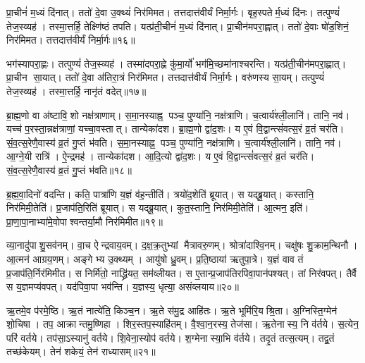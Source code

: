 प्रा॒चीनं॑ म॒ध्यं दि॑नात्।
ततो॑ दे॒वा उ॒क्थ्यं॑ निर॑मिमत।
तत्तदात्त॑वीर्यं निर्मा॒र्गः।
बृह॒स्पतेर्म॒ध्यं दि॑नः।
तत्पुण्यं॑ तेज॒स्व्यह॑।
तस्मा॒त्तर्\mbox{}हि॒ तेक्ष्णि॑ष्ठं तपति।
यत्प्र॑ती॒चीनं॑ म॒ध्यं दि॑नात्।
प्रा॒चीन॑मपरा॒ह्णात्।
ततो॑ दे॒वाः षो॑ड॒शिनं॒ निर॑मिमत।
तत्तदात्त॑वीर्यं निर्मा॒र्गः॥१६॥

भग॑स्यापरा॒ह्णः।
तत्पुण्यं॑ तेज॒स्व्यह॑।
तस्मा॑दपरा॒ह्णे कु॑मा॒र्यो॑ भग॑मि॒च्छमा॑नाश्चरन्ति।
यत्प्र॑ती॒चीन॑मपरा॒ह्णात्।
प्रा॒चीन सा॒यात्।
ततो॑ दे॒वा अ॑तिरा॒त्रं निर॑मिमत।
तत्तदात्त॑वीर्यं निर्मा॒र्गः।
वरु॑णस्य सा॒यम्।
तत्पुण्यं॑ तेज॒स्व्यह॑।
तस्मा॒त्तर्\mbox{}हि॒ नानृ॑तं वदेत्॥१७॥

ब्रा॒ह्म॒णो वा अ॑ष्टावि॒शो नक्ष॑त्राणाम्।
स॒मा॒नस्याह्न॒ पञ्च॒ पुण्या॑नि॒ नक्ष॑त्राणि।
च॒त्वार्य॑श्ली॒लानि॑।
तानि॒ नव॑।
यच्च॑ प॒रस्ता॒न्नक्ष॑त्राणां॒ यच्चा॒वस्तात्।
तान्येका॑दश।
ब्रा॒ह्म॒णो द्वा॑द॒शः।
य ए॒वं वि॒द्वान्त्सं॑वत्स॒रं व्र॒तं चर॑ति।
सं॒व॒त्स॒रेणै॒वास्य॑ व्र॒तं गु॒प्तं भ॑वति।
स॒मा॒नस्याह्न॒ पञ्च॒ पुण्या॑नि॒ नक्ष॑त्राणि।
च॒त्वार्य॑श्ली॒लानि॑।
तानि॒ नव॑।
आ॒ग्ने॒यी रात्रि॑।
ऐ॒न्द्रमह॑।
तान्येका॑दश।
आ॒दि॒त्यो द्वा॑द॒शः।
य ए॒वं वि॒द्वान्त्सं॑वत्स॒रं व्र॒तं चर॑ति।
सं॒व॒त्स॒रेणै॒वास्य॑ व्र॒तं गु॒प्तं भ॑वति॥१८॥\anuvakamend[स॒ङ्ग॒वाथ्षो॑ड॒शिनं॒ निर॑मिमत॒ तत्तदात्त॑वीर्यं निर्मा॒र्गो व॑देद्भवति समा॒नस्याह्न॒ पञ्च॒ पुण्या॑नि॒ नक्ष॑त्राण्य॒ष्टौ च॑]

ब्र॒ह्म॒वा॒दिनो॑ वदन्ति।
कति॒ पात्रा॑णि य॒ज्ञं व॑ह॒न्तीति॑।
त्रयो॑द॒शेति॑ ब्रूयात्।
स यद्ब्रू॒यात्।
कस्तानि॒ निर॑मिमी॒तेति॑।
प्र॒जाप॑ति॒रिति॑ ब्रूयात्।
स यद्ब्रू॒यात्।
कुत॒स्तानि॒ निर॑मिमी॒तेति॑।
आ॒त्मन॒ इति॑।
प्रा॒णा॒पा॒नाभ्या॑मे॒वोपा\-श्वन्तर्या॒मौ निर॑मिमीत॥१९॥

व्या॒नादु॑पाशु॒सव॑नम्।
वा॒च ऐन्द्रवाय॒वम्।
द॒क्ष॒क्र॒तुभ्यां मैत्रावरु॒णम्।
श्रोत्रा॑दाश्वि॒नम्।
चक्षु॑षः शु॒क्राम॒न्थिनौ।
आ॒त्मन॑ आग्रय॒णम्।
अङ्गेभ्य उ॒क्थ्यम्।
आयु॑षो ध्रु॒वम्।
प्र॒ति॒ष्ठाया॑ ऋतुपा॒त्रे।
य॒ज्ञं वाव तं प्र॒जाप॑ति॒र्निर॑मिमीत।
स निर्मि॑तो॒ नाद्ध्रि॑यत॒ सम॑व्लीयत।
स ए॒तान्प्र॒जाप॑तिरपिवा॒पान॑पश्यत्।
तां निर॑वपत्।
तैर्वै स य॒ज्ञमप्य॑वपत्।
यद॑पिवा॒पा भव॑न्ति।
य॒ज्ञस्य॒ धृत्या॒ असंव्लयाय॥२०॥\anuvakamend[उ॒पा॒श्व॒न्त॒र्या॒मौ निर॑मिमीतामिमीत॒ षट्च॑]

ऋ॒तमे॒व प॑रमे॒ष्ठि।
ऋ॒तं नात्ये॑ति॒ किञ्च॒न।
ऋ॒ते स॑मु॒द्र आहि॑तः।
ऋ॒ते भूमि॑रि॒यश्रि॒ता।
अ॒ग्निस्ति॒ग्मेन॑ शो॒चिषा।
तप॒ आक्रान्तमु॒ष्णिहा।
शिर॒स्तप॒स्याहि॑तम्।
वै॒श्वा॒न॒रस्य॒ तेज॑सा।
ऋ॒तेनास्य॒ नि व॑र्तये।
स॒त्येन॒ परि॑ वर्तये।
तप॑सा॒ऽस्यानु॑ वर्तये।
शि॒वेना॒स्योप॑ वर्तये।
श॒ग्मेनास्या॒भि व॑र्तये।
तदृ॒तं तत्स॒त्यम्।
तद्व्र॒तं तच्छ॑केयम्।
तेन॑ शकेयं॒ तेन॑ राध्यासम्॥२१॥

